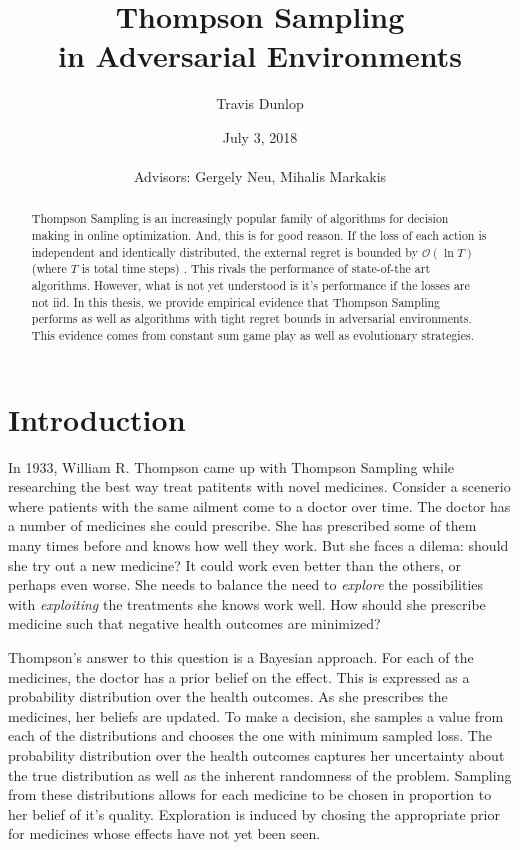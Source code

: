 \documentclass[10pt,a4paper]{article} %
\begin{document}
	\pagestyle{plain}
	\title{\rmfamily\normalfont Thompson Sampling \\in Adversarial Environments}
	\author{Travis Dunlop }
	\date{July 3, 2018\\ $\,$ 
			 \\Advisors: Gergely Neu, Mihalis Markakis} 
	
	\maketitle
	
	\begin{abstract}
		Thompson Sampling is an increasingly popular family of algorithms for decision making in online optimization.  And, this is for good reason.  If the loss of each action is independent and identically distributed, the external regret is bounded by $\mathcal{O}(\ln T)$ (where $T$ is total time steps) \cite{agrawal}. This rivals the performance of state-of-the art algorithms.  However, what is not yet understood is it's performance if the losses are not iid.  In this thesis, we provide empirical evidence that Thompson Sampling performs as well as algorithms with tight regret bounds in adversarial environments.  This evidence comes from constant sum game play as well as evolutionary strategies.
	\end{abstract}
	
	\section{Introduction}
	
	In 1933, William R. Thompson came up with Thompson Sampling \cite{original_gangster} while researching the best way treat patitents with novel medicines.  Consider a scenerio where patients with the same ailment come to a doctor over time.  The doctor has a number of medicines she could prescribe.  She has prescribed some of them many times before and knows how well they work.  But she faces a dilema: should she try out a new medicine? It could work even better than the others, or perhaps even worse.  She needs to balance the need to \textit{explore} the possibilities with \textit{exploiting} the treatments she knows work well.  How should she prescribe medicine such that negative health outcomes are minimized?
	
	Thompson's answer to this question is a Bayesian approach.  For each of the medicines, the doctor has a prior belief on the effect.  This is expressed as a probability distribution over the health outcomes.  As she prescribes the medicines, her beliefs are updated.  To make a decision, she samples a value from each of the distributions and chooses the one with minimum sampled loss.  The probability distribution over the health outcomes captures her uncertainty about the true distribution as well as the inherent randomness of the problem.  Sampling from these distributions allows for each medicine to be chosen in proportion to her belief of it's quality.  Exploration is induced by chosing the appropriate prior for medicines whose effects have not yet been seen.
	
\end{document}
